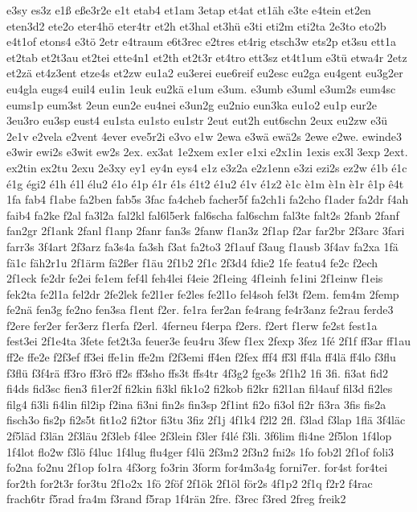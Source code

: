 {e3sy
es3z
e1ß
eße3r2e
e1t
etab4
et1am
3etap
et4at
et1äh
e3te
e4tein
et2en
eten3d2
ete2o
eter4hö
eter4tr
et2h
et3hal
et3hü
e3ti
eti2m
eti2ta
2e3to
eto2b
e4t1of
etons4
e3tö
2etr
e4traum
e6t3rec
e2tres
et4rig
etsch3w
ets2p
et3su
ett1a
et2tab
et2t3au
et2tei
ette4n1
et2th
et2t3r
et4tro
ett3sz
et4t1um
e3tü
etwa4r
2etz
et2zä
et4z3ent
etze4s
et2zw
eu1a2
eu3erei
eue6reif
eu2esc
eu2ga
eu4gent
eu3g2er
eu4gla
eugs4
euil4
eu1in
1euk
eu2kä
e1um
e3um.
e3umb
e3uml
e3um2s
eum4sc
eums1p
eum3st
2eun
eun2e
eu4nei
e3un2g
eu2nio
eun3ka
eu1o2
eu1p
eur2e
3eu3ro
eu3sp
eust4
eu1sta
eu1sto
eu1str
2eut
eut2h
eut6schn
2eux
eu2zw
e3ü
2e1v
e2vela
e2vent
4ever
eve5r2i
e3vo
e1w
2ewa
e3wä
ewä2s
2ewe
e2we.
ewinde3
e3wir
ewi2s
e3wit
ew2s
2ex.
ex3at
1e2xem
ex1er
e1xi
e2x1in
1exis
ex3l
3exp
2ext.
ex2tin
ex2tu
2exu
2e3xy
ey1
ey4n
eys4
e1z
e3z2a
e2z1enn
e3zi
ezi2s
ez2w
é1b
é1c
é1g
égi2
é1h
é1l
élu2
é1o
é1p
é1r
é1s
é1t2
é1u2
é1v
é1z2
è1c
è1m
è1n
è1r
ê1p
ê4t
1fa
fab4
f1abe
fa2ben
fab5s
3fac
fa4cheb
facher5f
fa2ch1i
fa2cho
f1ader
fa2dr
f4ah
faib4
fa2ke
f2al
fa3l2a
fal2kl
fal6l5erk
fal6scha
fal6schm
fal3te
falt2s
2fanb
2fanf
fan2gr
2f1ank
2fanl
f1anp
2fanr
fan3s
2fanw
f1an3z
2f1ap
f2ar
far2br
2f3arc
3fari
farr3s
3f4art
2f3arz
fa3s4a
fa3sh
f3at
fa2to3
2f1auf
f3aug
f1ausb
3f4av
fa2xa
1fä
fä1c
fäh2r1u
2f1ärm
fä2ßer
f1äu
2f1b2
2f1c
2f3d4
fdie2
1fe
featu4
fe2c
f2ech
2f1eck
fe2dr
fe2ei
fe1em
fef4l
feh4lei
f4eie
2f1eing
4f1einh
fe1ini
2f1einw
f1eis
fek2ta
fe2l1a
fel2dr
2fe2lek
fe2l1er
fe2les
fe2l1o
fel4soh
fel3t
f2em.
fem4m
2femp
fe2nä
fen3g
fe2no
fen3sa
f1ent
f2er.
fe1ra
fer2an
fe4rang
fe4r3anz
fe2rau
ferde3
f2ere
fer2er
fer3erz
f1erfa
f2erl.
4ferneu
f4erpa
f2ers.
f2ert
f1erw
fe2st
fest1a
fest3ei
2f1e4ta
3fete
fet2t3a
feuer3e
feu4ru
3few
f1ex
2fexp
3fez
1fé
2f1f
ff3ar
ff1au
ff2e
ffe2e
f2f3ef
ff3ei
ffe1in
ffe2m
f2f3emi
ff4en
f2fex
fff4
ff3l
ff4la
ff4lä
ff4lo
f3flu
f3flü
f3f4rä
ff3ro
ff3rö
ff2s
ff3sho
ffs3t
ffs4tr
4f3g2
fge3s
2f1h2
1fi
3fi.
fi3at
fid2
fi4ds
fid3sc
fien3
fi1er2f
fi2kin
fi3kl
fik1o2
fi2kob
fi2kr
fi2l1an
fil4auf
fil3d
fi2les
filg4
fi3li
fi4lin
fil2ip
f2ina
fi3ni
fin2s
fin3sp
2f1int
fi2o
fi3ol
fi2r
fi3ra
3fis
fis2a
fisch3o
fis2p
fi2s5t
fit1o2
fi2tor
fi3tu
3fiz
2f1j
4f1k4
f2l2
2fl.
f3lad
f3lap
1flä
3f4läc
2f5läd
f3län
2f3läu
2f3leb
f4lee
2f3lein
f3ler
f4lé
f3li.
3f6lim
fli4ne
2f5lon
1f4lop
1f4lot
flo2w
f3lö
f4luc
1f4lug
flu4ger
f4lü
2f3m2
2f3n2
fni2s
1fo
fob2l
2f1of
foli3
fo2na
fo2nu
2f1op
fo1ra
4f3org
fo3rin
3form
for4m3a4g
forni7er.
for4st
for4tei
for2th
for2t3r
for3tu
2f1o2x
1fö
2föf
2f1ök
2f1öl
för2s
4f1p2
2f1q
f2r2
f4rac
frach6tr
f5rad
fra4m
f3rand
f5rap
1f4rän
2fre.
f3rec
f3red
2freg
freik2
}
